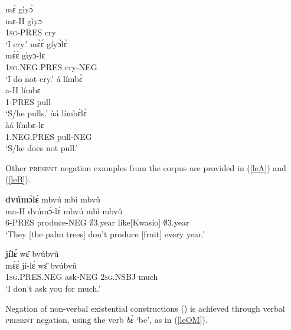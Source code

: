 \begin{exe}
\ex\label{le1}
\begin{multicols}{2}
\begin{xlist}
\ex \label{le1a} \glll  mɛ́ gìyɔ̀ \\
          mɛ-H gìyɔ \\
           1\textsc{sg}-PRES cry   \\
    \trans `I cry.'
\ex \label{le1b} 
\glll  mɛ̀ɛ́ gíyɔ̀lɛ̀\\
          mɛ̀ɛ́ gìyɔ-lɛ \\
           1\textsc{sg}.NEG.PRES cry-NEG   \\
    \trans `I do not cry.'
\ex \label{le1c} \glll  á límbɛ̀\\
          a-H límbɛ \\
           1-PRES pull   \\
    \trans `S/he pulls.'
\ex  \label{le1d}
\glll  àá límbɛ́lɛ́\\
          àá límbɛ-lɛ \\
           1.NEG.PRES pull-NEG   \\
    \trans `S/he does not pull.'
\end{xlist}
\end{multicols}
\end{exe}

\noindent Other \textsc{present} negation examples from the corpus are provided in (\ref{leA}) and (\ref{leB}).


\begin{exe} 
\ex\label{leA} 
   {\bfseries dvúmɔ́lɛ́} mbvú mbì mbvû \\
        ma-H dvúmɔ́-lɛ́ mbvú mbì mbvû \\
           6-PRES produce-NEG  $\emptyset$3.year like[Kwasio] $\emptyset$3.year \\
    \trans `They [the palm trees] don't produce [fruit] every year.'
\end{exe} 

\begin{exe} 
\ex\label{leB}
   {\bfseries jílɛ́} wɛ̂ bvúbvû \\
       mɛ̀ɛ́ jí-lɛ́ wɛ̂ bvúbvû \\
         1\textsc{sg}.PRES.NEG ask-NEG 2\textsc{sg}.NSBJ much \\
    \trans `I don't ask you for much.'
\end{exe}

Negation of non-verbal existential constructions () is achieved through verbal \textsc{present} negation, using the verb {\itshape bɛ̀} `be', as in (\ref{leOM}). 

